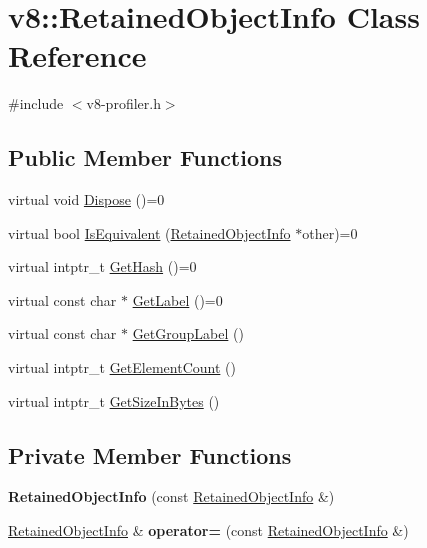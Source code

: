 \hypertarget{classv8_1_1_retained_object_info}{}\section{v8\+:\+:Retained\+Object\+Info Class Reference}
\label{classv8_1_1_retained_object_info}


{\ttfamily \#include $<$v8-\/profiler.\+h$>$}

\subsection*{Public Member Functions}
\begin{DoxyCompactItemize}
\item 
virtual void \hyperlink{classv8_1_1_retained_object_info_a5011203f7c5949049ba36b8059f03eca}{Dispose} ()=0
\item 
virtual bool \hyperlink{classv8_1_1_retained_object_info_a286103bb076c85415919c86b1838c990}{Is\+Equivalent} (\hyperlink{classv8_1_1_retained_object_info}{Retained\+Object\+Info} $\ast$other)=0
\item 
virtual intptr\+\_\+t \hyperlink{classv8_1_1_retained_object_info_a6fdbfa242b95615e63f08433419c8066}{Get\+Hash} ()=0
\item 
virtual const char $\ast$ \hyperlink{classv8_1_1_retained_object_info_ad19106fc7f0499fd45005077551d54c0}{Get\+Label} ()=0
\item 
virtual const char $\ast$ \hyperlink{classv8_1_1_retained_object_info_adf835370c5516f2a89dd2d3f83dee10b}{Get\+Group\+Label} ()
\item 
virtual intptr\+\_\+t \hyperlink{classv8_1_1_retained_object_info_ae6865597469bc7d28bd8ec71b4b890bd}{Get\+Element\+Count} ()
\item 
virtual intptr\+\_\+t \hyperlink{classv8_1_1_retained_object_info_a1a899eed0b1f6e046edc3c7a7c08aa8c}{Get\+Size\+In\+Bytes} ()
\end{DoxyCompactItemize}
\subsection*{Private Member Functions}
\begin{DoxyCompactItemize}
\item 
{\bfseries Retained\+Object\+Info} (const \hyperlink{classv8_1_1_retained_object_info}{Retained\+Object\+Info} \&)\hypertarget{classv8_1_1_retained_object_info_af2d2af908d53a2e4e2f543b7c67057c8}{}\label{classv8_1_1_retained_object_info_af2d2af908d53a2e4e2f543b7c67057c8}

\item 
\hyperlink{classv8_1_1_retained_object_info}{Retained\+Object\+Info} \& {\bfseries operator=} (const \hyperlink{classv8_1_1_retained_object_info}{Retained\+Object\+Info} \&)\hypertarget{classv8_1_1_retained_object_info_a11fcc91279bee920e05e217c77f78eed}{}\label{classv8_1_1_retained_object_info_a11fcc91279bee920e05e217c77f78eed}

\end{DoxyCompactItemize}


